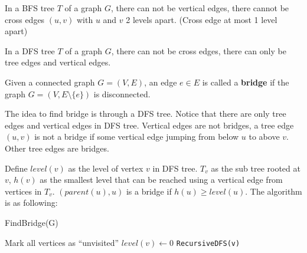                     In a BFS tree $T$ of a graph $G$, there can not be vertical edges, there cannot be cross edges $(u, v)$ with $u$ and $v$ 2 levels apart. (Cross edge at most 1 level apart)

                    In a DFS tree $T$ of a graph $G$, there can not be cross edges, there can only be tree edges and vertical edges.

                    \begin{definition}[bridge]
                        Given a connected graph $G=(V, E)$, an edge $e \in E$ is called a \textbf{bridge} if the graph $G=(V, E\setminus \{e\})$ is disconnected.
                    \end{definition}

                    The idea to find bridge is through a DFS tree. Notice that there are only tree edges and vertical edges in DFS tree. Vertical edges are not bridges, a tree edge $(u, v)$ is not a bridge if some vertical edge jumping from below $u$ to above $v$. Other tree edges are bridges.

                    Define $level(v)$ as the level of vertex $v$ in DFS tree. $T_v$ as the sub tree rooted at $v$, $h(v)$ as the smallest level that can be reached using a vertical edge from vertices in $T_v$. $(parent(u), u)$ is a bridge if $h(u) \ge level(u)$. The algorithm is as following:
                    \begin{algorithm}[H]
                        \caption{FindBridge(G)}
                        \begin{algorithmic}[1]
                            \State Mark all vertices as ``unvisited''
                                    \State $level(v) \gets 0$
                                    \State \texttt{RecursiveDFS(v)}
                                \EndIf
                            \EndFor
                        \end{algorithmic}
                    \end{algorithm}

